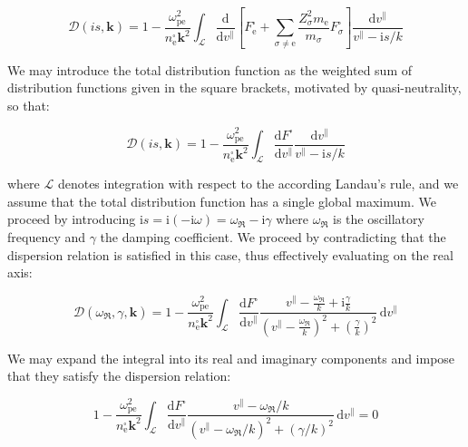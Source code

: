 \begin{equation}
    \mathcal{D}(is,\mathbf{k})=1-\frac{\omega_\text{pe}^2}{n_\text{e}^\square\mathbf{k}^2}\int_\mathcal{L}\frac{\mathrm{d}}{\mathrm{d}v^\parallel}\left[F_\text{e}^\square+\sum_{\sigma\neq\text{e}}\frac{Z_\sigma^2m_\text{e}}{m_\sigma}F_\sigma^\square\right]\frac{\mathrm{d}v^\parallel}{v^\parallel-\mathrm{i}s/k}
\end{equation}

We may introduce the total distribution function as the weighted sum of distribution functions given in the square brackets, motivated by quasi-neutrality, so that:

\begin{equation}
    \mathcal{D}(is,\mathbf{k})=1-\frac{\omega_\text{pe}^2}{n_\text{e}^\square\mathbf{k}^2}\int_{\mathcal{L}}\frac{\mathrm{d}F^\square}{\mathrm{d}v^\parallel}\frac{\mathrm{d}v^\parallel}{v^\parallel-\mathrm{i}s/k}
\end{equation}

where $\mathcal{L}$ denotes integration with respect to the according Landau's rule, and we assume that the total distribution function has a single global maximum. We proceed by introducing $\mathrm{i}s=\mathrm{i}(-\mathrm{i}\omega)=\omega_{\Re}-\mathrm{i}\gamma$ where $\omega_{\Re}$ is the oscillatory frequency and $\gamma$ the damping coefficient. We proceed by contradicting that the dispersion relation is satisfied in this case, thus effectively evaluating on the real axis:

\begin{equation}
    \mathcal{D}(\omega_{\Re},\gamma,\mathbf{k})=1-\frac{\omega_\text{pe}^2}{n_\text{e}^\square\mathbf{k}^2}\int_{\mathcal{L}}\frac{\mathrm{d}F^\square}{\mathrm{d}v^\parallel}\frac{v^\parallel-\frac{\omega_{\Re}}{k}+\mathrm{i}\frac{\gamma}{k}}{\left(v^\parallel-\frac{\omega_{\Re}}{k}\right)^2+\left(\frac{\gamma}{k}\right)^2}\,\mathrm{d}v^\parallel
\end{equation}

We may expand the integral into its real and imaginary components and impose that they satisfy the dispersion relation:

\begin{equation}
    1-\frac{\omega_\text{pe}^2}{n_\text{e}^\square\mathbf{k}^2}\int_{\mathcal{L}}\frac{\mathrm{d}F^\square}{\mathrm{d}v^\parallel}\frac{v^\parallel-\omega_{\Re}/k}{\left(v^\parallel-\omega_{\Re}/k\right)^2+\left(\gamma/k\right)^2}\,\mathrm{d}v^\parallel=0
\end{equation}

